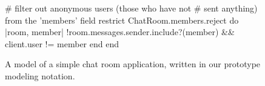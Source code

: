 \begin{figure*}[t!]
\begin{minipage}[t]{.54\linewidth}
\begin{redlisting}
  # filter out anonymous users (those who have not 
  # sent anything) from the 'members' field
  restrict ChatRoom.members.reject do |room, member|
    !room.messages.sender.include?(member) &&
    client.user != member
  end
end

\end{redlisting}
\end{minipage}
\caption{A model of a simple chat room application, written in 
our prototype modeling notation.}
\label{fig:spec}
\end{figure*}
